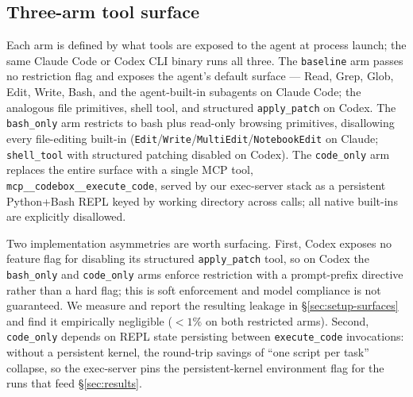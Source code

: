 %
%

\subsection{Three-arm tool surface}
\label{sec:method-arms}

Each arm is defined by what tools are exposed to the agent at process
launch; the same Claude Code or Codex CLI binary runs all three. The
\texttt{baseline} arm passes no restriction flag and exposes the agent's
default surface --- Read, Grep, Glob, Edit, Write, Bash, and the
agent-built-in subagents on Claude Code; the analogous file
primitives, shell tool, and structured \texttt{apply\allowbreak\_patch} on Codex.
The \texttt{bash\_only} arm restricts to bash plus read-only browsing
primitives, disallowing every file-editing built-in
(\texttt{Edit}/\allowbreak\texttt{Write}/\allowbreak\texttt{MultiEdit}/\allowbreak\texttt{NotebookEdit}
on Claude; \texttt{shell\_tool} with structured patching disabled on
Codex). The \texttt{code\_only} arm replaces the entire surface with a
single MCP tool, \texttt{mcp\allowbreak\_\_codebox\allowbreak\_\_execute\allowbreak\_code}, served by
our exec-server stack as a persistent Python+Bash REPL keyed by
working directory across calls; all native built-ins are explicitly
disallowed.

Two implementation asymmetries are worth surfacing. First, Codex
exposes no feature flag for disabling its structured
\texttt{apply\allowbreak\_patch} tool, so on Codex the \texttt{bash\_only} and
\texttt{code\_only} arms enforce restriction with a prompt-prefix
directive rather than a hard flag; this is soft enforcement and model
compliance is not guaranteed. We measure and report the resulting
leakage in §\ref{sec:setup-surfaces} and find it empirically
negligible (${<}1\%$ on both restricted arms). Second, \texttt{code\_only} depends on REPL state
persisting between \texttt{execute\_code} invocations: without a
persistent kernel, the round-trip savings of ``one script per task''
collapse, so the exec-server pins
the persistent-kernel environment flag for the runs that feed §\ref{sec:results}.

